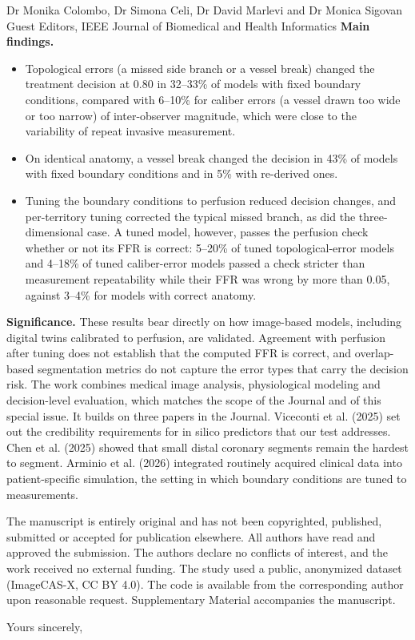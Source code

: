 \documentclass[10pt]{letter}
\begin{document}
\begin{letter}{Dr Monika Colombo, Dr Simona Celi, Dr David Marlevi and Dr Monica Sigovan\\Guest Editors, IEEE Journal of Biomedical and Health Informatics}
\textbf{Main findings.}
\begin{itemize}
\item Topological errors (a missed side branch or a vessel break) changed the treatment decision at 0.80 in 32--33\%
of models with fixed boundary conditions, compared with 6--10\% for caliber errors (a vessel drawn too wide or too narrow) of inter-observer magnitude, which
were close to the variability of repeat invasive measurement.
\item On identical anatomy, a vessel break changed the decision in 43\% of models with fixed boundary conditions and
in 5\% with re-derived ones.
\item Tuning the boundary conditions to perfusion reduced decision changes, and per-territory tuning corrected the
typical missed branch, as did the three-dimensional case. A tuned model, however, passes the perfusion check whether
or not its FFR is correct: 5--20\% of tuned topological-error models and 4--18\% of tuned caliber-error models passed
a check stricter than measurement repeatability while their FFR was wrong by more than 0.05, against 3--4\% for
models with correct anatomy.
\end{itemize}

\textbf{Significance.} These results bear directly on how image-based models, including digital twins calibrated to
perfusion, are validated. Agreement with
perfusion after tuning does not establish that the computed FFR is correct, and overlap-based segmentation metrics do not capture the error types that
carry the decision risk. The work combines medical image analysis, physiological modeling and decision-level
evaluation, which matches the scope of the Journal and of this special issue. It builds on three papers in the
Journal. Viceconti et al. (2025) set out the credibility requirements for in silico predictors that our test
addresses. Chen et al. (2025) showed that small distal coronary segments remain the hardest to segment. Arminio et al.
(2026) integrated routinely acquired clinical data into patient-specific simulation, the setting in which boundary
conditions are tuned to measurements.

The manuscript is entirely original and has not been copyrighted, published, submitted or accepted for publication
elsewhere. All authors have read
and approved the submission. The authors declare no conflicts of interest, and the work received no external funding.
The study used a public, anonymized dataset (ImageCAS-X, CC BY 4.0). The code is available from the corresponding author upon reasonable request. Supplementary Material accompanies the manuscript.

\closing{Yours sincerely,}
\end{letter}
\end{document}
